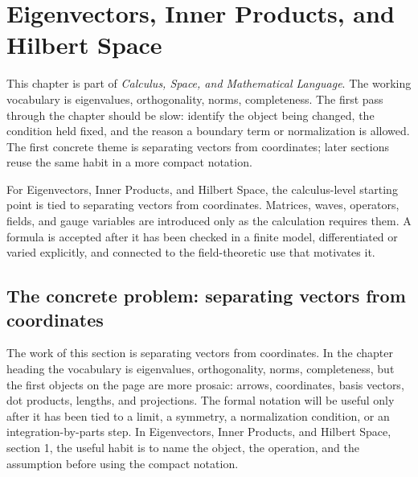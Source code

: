 \chapter{Eigenvectors, Inner Products, and Hilbert Space}


This chapter is part of \emph{Calculus, Space, and Mathematical Language}.  The working vocabulary is eigenvalues, orthogonality, norms, completeness.  The first pass through the chapter should be slow: identify the object being changed, the condition held fixed, and the reason a boundary term or normalization is allowed.  The first concrete theme is separating vectors from coordinates; later sections reuse the same habit in a more compact notation.

For Eigenvectors, Inner Products, and Hilbert Space, the calculus-level starting point is tied to separating vectors from coordinates.  Matrices, waves, operators, fields, and gauge variables are introduced only as the calculation requires them.  A formula is accepted after it has been checked in a finite model, differentiated or varied explicitly, and connected to the field-theoretic use that motivates it.

\section{The concrete problem: separating vectors from coordinates}













The work of this section is separating vectors from coordinates.  In the chapter heading the vocabulary is eigenvalues, orthogonality, norms, completeness, but the first objects on the page are more prosaic: arrows, coordinates, basis vectors, dot products, lengths, and projections.  The formal notation will be useful only after it has been tied to a limit, a symmetry, a normalization condition, or an integration-by-parts step.  In Eigenvectors, Inner Products, and Hilbert Space, section 1, the useful habit is to name the object, the operation, and the assumption before using the compact notation.

